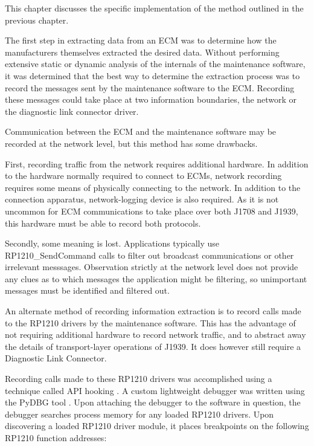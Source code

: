 
This chapter discusses the specific implementation of the method outlined in the previous chapter.


The first step in extracting data from an ECM was to determine how the manufacturers themselves extracted
the desired data. Without performing extensive static or dynamic analysis of the internals of the maintenance
software, it was determined that the best way to determine the extraction process was to record the messages
sent by the maintenance software to the ECM. Recording these messages could take place at two information boundaries,
the network or the diagnostic link connector driver.


Communication between the ECM and the maintenance software may be recorded at the network level, but this method
has some drawbacks.

First, recording traffic from the network requires additional hardware. In addition to the hardware normally required
to connect to ECMs, network recording requires some means of physically connecting to the network. In addition to the 
connection apparatus, network-logging device is also required. As it is not uncommon for ECM communications to take place over both J1708 and J1939, 
this hardware must be able to record both protocols.

Secondly, some meaning is lost. Applications typically use RP1210\_SendCommand calls to filter out broadcast communications
or other irrelevant messsages. Observation strictly at the network level does not provide any clues as to which messages
the application might be filtering, so unimportant messages must be identified and filtered out.


An alternate method of recording information extraction is to record calls made to the RP1210 drivers
by the maintenance software. This has the advantage of not requiring additional hardware to 
record network traffic, and to abstract away the details of transport-layer operations of J1939. It does however
still require a Diagnostic Link Connector.

Recording calls made to these RP1210 drivers was accomplished using a technique called API hooking \cite{Berdajs2010}.
A custom lightweight debugger was written using the PyDBG tool \cite{Amini2012}. Upon attaching the debugger to the software
in question, the debugger searches process memory for any loaded RP1210 drivers. Upon discovering a loaded RP1210
driver module, it places breakpoints on the following RP1210 function addresses:


